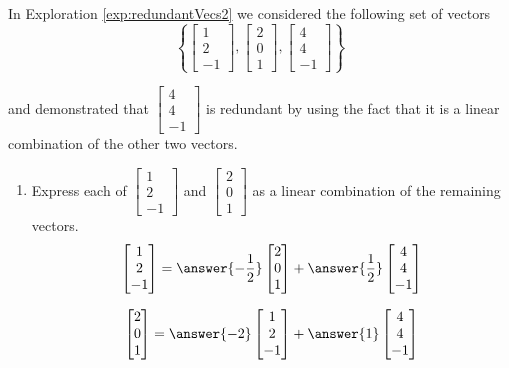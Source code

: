 \documentclass{ximera}
\begin{document}
\begin{problem}\label{prob:redundant1}
In Exploration \ref{exp:redundantVecs2} we considered the following set of vectors
$$\left\{\begin{bmatrix}1\\2\\-1\end{bmatrix},\begin{bmatrix}2\\0\\1\end{bmatrix},\begin{bmatrix}4\\4\\-1\end{bmatrix}\right\}$$

and demonstrated that $\begin{bmatrix}4\\4\\-1\end{bmatrix}$ is redundant by using the fact that it is a linear combination of the other two vectors.  
\begin{enumerate}
    \item Express each of $\begin{bmatrix}1\\2\\-1\end{bmatrix}$ and $\begin{bmatrix}2\\0\\1\end{bmatrix}$ as a linear combination of the remaining vectors.
    $$\begin{bmatrix}1\\2\\-1\end{bmatrix}=\answer{-\frac{1}{2}}\begin{bmatrix}2\\0\\1\end{bmatrix}+\answer{\frac{1}{2}}\begin{bmatrix}4\\4\\-1\end{bmatrix}$$

    $$\begin{bmatrix}2\\0\\1\end{bmatrix}=\answer{-2}\begin{bmatrix}1\\2\\-1\end{bmatrix}+\answer{1}\begin{bmatrix}4\\4\\-1\end{bmatrix}$$


\end{enumerate}
\end{problem}
\end{document}
